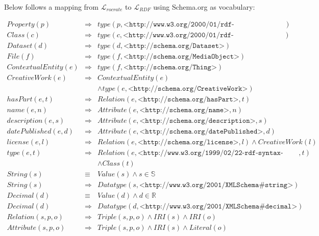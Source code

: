 Below follows a mapping from $\mathcal{L}_{rocrate}$ to $\mathcal{L}_{RDF}$ using Schema.org as vocabulary:

\small
\begin{eqnarray*}
Property(p)         & \Rightarrow &     type(p, \texttt{<http://www.w3.org/2000/01/rdf-schema\#Property>})   \\
Class(c)            & \Rightarrow &     type(c, \texttt{<http://www.w3.org/2000/01/rdf-schema\#Class>})  \\
Dataset(d)          & \Rightarrow &     type(d, \texttt{<http://schema.org/Dataset>})   \\
File(f)             & \Rightarrow &     type(f, \texttt{<http://schema.org/MediaObject>})   \\
ContextualEntity(e) & \Rightarrow &     type(f, \texttt{<http://schema.org/Thing>})   \\
CreativeWork(e)     & \Rightarrow &     ContextualEntity(e) \\
                    & & \land type(e, \texttt{<http://schema.org/CreativeWork>})  \\
hasPart(e, t)       & \Rightarrow &     Relation(e, \texttt{<http://schema.org/hasPart>}, t)    \\
name(e, n)          & \Rightarrow &     Attribute(e, \texttt{<http://schema.org/name>}, n)  \\
description(e, s)   & \Rightarrow &     Attribute(e, \texttt{<http://schema.org/description>}, s)   \\
datePublished(e, d) & \Rightarrow &     Attribute(e, \texttt{<http://schema.org/datePublished>}, d) \\
license(e, l)       & \Rightarrow &     Relation(e, \texttt{<http://schema.org/license>}, l) \land CreativeWork(l) \\
type(e, t)          & \Rightarrow &     Relation(e, \texttt{<http://www.w3.org/1999/02/22-rdf-syntax-ns\#type>}, t) \\
                    & & \land Class(t)   \\
String(s)           & \equiv &          Value(s) \land  s \in \mathbb{S} \\
String(s)           & \Rightarrow &     Datatype(s, \texttt{<http://www.w3.org/2001/XMLSchema\#string>}) \\
Decimal(d)          & \equiv &          Value(d) \land  d \in \mathbb{R} \\
Decimal(d)          & \Rightarrow &     Datatype(d, \texttt{<http://www.w3.org/2001/XMLSchema\#decimal>}) \\
Relation(s,p,o)     & \Rightarrow &     Triple(s,p,o) \land IRI(s) \land IRI(o) \\
Attribute(s,p,o)    & \Rightarrow &     Triple(s,p,o) \land IRI(s) \land Literal(o) \\
\end{eqnarray*}
\normalsize

